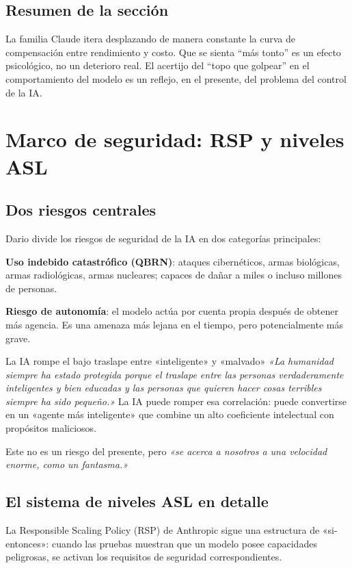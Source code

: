 \documentclass[a4paper]{article}
\begin{document}
\subsection{Resumen de la sección}

La familia Claude itera desplazando de manera constante la curva de compensación entre rendimiento y costo. Que se sienta ``más tonto'' es un efecto psicológico, no un deterioro real. El acertijo del ``topo que golpear'' en el comportamiento del modelo es un reflejo, en el presente, del problema del control de la IA.
\section{Marco de seguridad: RSP y niveles ASL}

\subsection{Dos riesgos centrales}

Dario divide los riesgos de seguridad de la IA en dos categorías principales:

\textbf{Uso indebido catastrófico (QBRN)}: ataques cibernéticos, armas biológicas, armas radiológicas, armas nucleares; capaces de dañar a miles o incluso millones de personas.

\textbf{Riesgo de autonomía}: el modelo actúa por cuenta propia después de obtener más agencia. Es una amenaza más lejana en el tiempo, pero potencialmente más grave.

\begin{warningbox}{La IA rompe el bajo traslape entre «inteligente» y «malvado»}
\textit{«La humanidad siempre ha estado protegida porque el traslape entre las personas verdaderamente inteligentes y bien educadas y las personas que quieren hacer cosas terribles siempre ha sido pequeño.»} La IA puede romper esa correlación: puede convertirse en un «agente más inteligente» que combine un alto coeficiente intelectual con propósitos maliciosos.

Este no es un riesgo del presente, pero \textit{«se acerca a nosotros a una velocidad enorme, como un fantasma.»}
\end{warningbox}

\subsection{El sistema de niveles ASL en detalle}

La Responsible Scaling Policy (RSP) de Anthropic sigue una estructura de «si-entonces»: cuando las pruebas muestran que un modelo posee capacidades peligrosas, se activan los requisitos de seguridad correspondientes.
\end{document}
